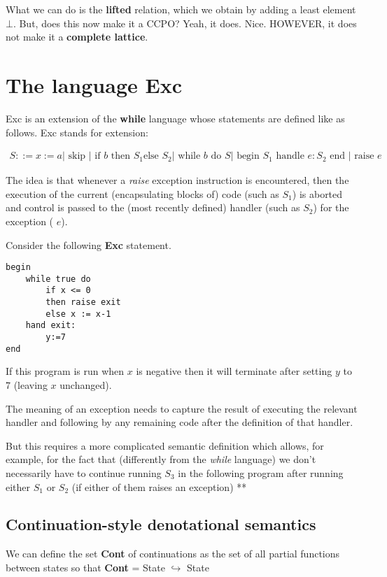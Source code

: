 \documentclass[11pt,a4paper,headsepline,titlepage,dvipsnames,cmyk]{scrartcl}
\newcommand\pfun{\hookrightarrow}
\begin{document}
What we can do is the \textbf{lifted} relation, which we obtain by adding
a least element $\bot$. But, does this now make it a CCPO? Yeah, it does.
Nice. HOWEVER, it does not make it a \textbf{complete lattice}.

\section{The language Exc}%
\label{sec:exc-language}
Exc is an extension of the \textbf{while} language whose statements are
defined like as follows. Exc stands for extension:

\begin{align*}
    S ::= x := a | \text{ skip } | \text{ if }b\text{ then } S_1 \text{
    else } S_2 | \text{ while } b \text{ do } S | \text{ begin } S_1
    \text{ handle } e : S_2 \text{ end } | \text{ raise } e
\end{align*}

The idea is that whenever a {\color{green} \textit{raise}} exception
instruction is encountered, then the execution of the current
(encapsulating blocks of) code (such as {\color{blue} $S_1$}) is aborted
and control is passed to the (most recently defined) handler (such as
{\color{blue} $S_2$}) for the exception ({\color{blue} $e$}).

Consider the following \textbf{Exc} statement.
\begin{lstlisting}
begin
    while true do
        if x <= 0
        then raise exit
        else x := x-1
    hand exit:
        y:=7
end
\end{lstlisting}

If this program is run when $x$ is negative then it will terminate after
setting $y$ to 7 (leaving $x$ unchanged).

The meaning of an exception needs to capture the result of executing the
relevant handler and following by any remaining code after the definition
of that handler.

But this requires a more complicated semantic definition which allows, for
example, for the fact that (differently from the \textit{while} language)
we don't necessarily have to continue running $S_3$ in the following
program after running either $S_1$ or $S_2$ (if either of them raises an
exception) ** %

\subsection{Continuation-style denotational semantics}%
\label{sub:continuation-style}
We can define the set {\color{red}\textbf{Cont}} of continuations as the
set of all partial functions between states so that
{\color{red}\textbf{Cont}} = {\color{red}State} $\pfun$ {\color{red}State}
\end{document}

